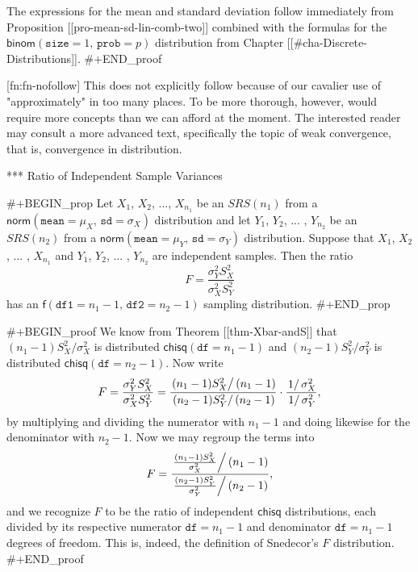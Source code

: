 The expressions for the mean and standard deviation follow immediately
from Proposition [[pro-mean-sd-lin-comb-two]] combined with the formulas
for the \(\mathsf{binom}(\mathtt{size}=1,\,\mathtt{prob}=p)\)
distribution from Chapter [[#cha-Discrete-Distributions]].
#+END_proof

[fn:fn-nofollow] This does not explicitly follow because of our
cavalier use of "approximately" in too many places. To be more
thorough, however, would require more concepts than we can afford at
the moment. The interested reader may consult a more advanced text,
specifically the topic of weak convergence, that is, convergence in
distribution.

*** Ratio of Independent Sample Variances

#+BEGIN_prop
Let \(X_{1}\), \(X_{2}\), ..., \(X_{n_{1}}\) be an \(SRS(n_{1})\) from
a \(\mathsf{norm}(\mathtt{mean}=\mu_{X},\,\mathtt{sd}=\sigma_{X})\)
distribution and let \(Y_{1}\), \(Y_{2}\), ... , \(Y_{n_{2}}\) be an
\(SRS(n_{2})\) from a
\(\mathsf{norm}(\mathtt{mean}=\mu_{Y},\,\mathtt{sd}=\sigma_{Y})\)
distribution. Suppose that \(X_{1}\), \(X_{2}\), ... , \(X_{n_{1}}\)
and \(Y_{1}\), \(Y_{2}\), ... , \(Y_{n_{2}}\) are independent
samples. Then the ratio
\begin{equation}
F=\frac{\sigma_{Y}^{2}S_{X}^{2}}{\sigma_{X}^{2}S_{Y}^{2}}
\end{equation}
has an \(\mathsf{f}(\mathtt{df1}=n_{1}-1,\,\mathtt{df2}=n_{2}-1)\)
sampling distribution.
#+END_prop

#+BEGIN_proof
We know from Theorem [[thm-Xbar-andS]] that
\((n_{1}-1)S_{X}^{2}/\sigma_{X}^{2}\) is distributed
\(\mathsf{chisq}(\mathtt{df}=n_{1}-1)\) and
\((n_{2}-1)S_{Y}^{2}/\sigma_{Y}^{2}\) is distributed
\(\mathsf{chisq}(\mathtt{df}=n_{2}-1)\). Now write \[
F=\frac{\sigma_{Y}^{2}S_{X}^{2}}{\sigma_{X}^{2}S_{Y}^{2}}=\frac{\left.(n_{1}-1)S_{X}^{2}\right/
(n_{1}-1)}{\left.(n_{2}-1)S_{Y}^{2}\right/
(n_{2}-1)}\cdot\frac{\left.1\right/ \sigma_{X}^{2}}{\left.1\right/
\sigma_{Y}^{2}}, \] by multiplying and dividing the numerator with
\(n_{1}-1\) and doing likewise for the denominator with
\(n_{2}-1\). Now we may regroup the terms into \[
F=\frac{\left.\frac{(n_{1}-1)S_{X}^{2}}{\sigma_{X}^{2}}\right/
(n_{1}-1)}{\left.\frac{(n_{2}-1)S_{Y}^{2}}{\sigma_{Y}^{2}}\right/
(n_{2}-1)}, \] and we recognize \(F\) to be the ratio of independent
\(\mathsf{chisq}\) distributions, each divided by its respective
numerator \(\mathtt{df}=n_{1}-1\) and denominator
\(\mathtt{df}=n_{1}-1\) degrees of freedom. This is, indeed, the
definition of Snedecor's \(F\) distribution.
#+END_proof

